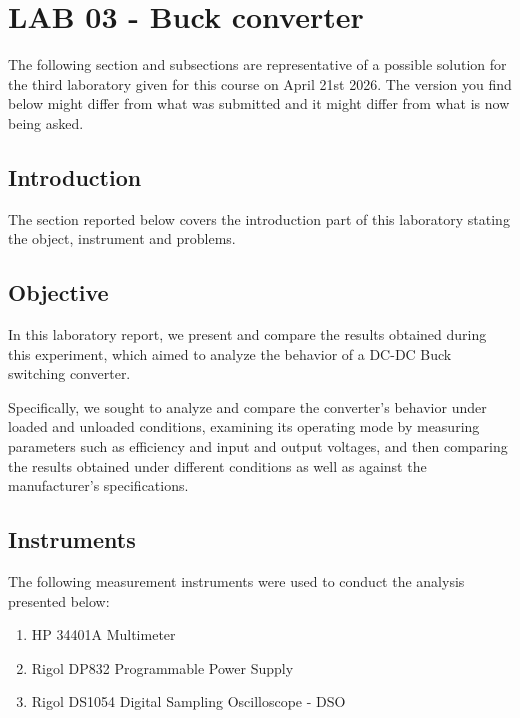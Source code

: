 \documentclass[../main.tex]{subfiles}
\begin{document}
\clearpage
\thispagestyle{empty}
\vspace*{7cm}
\section{LAB 03 - Buck converter}
\vspace*{1.5cm}

The following section and subsections are representative of a possible solution for the third laboratory given for this course on April 21st 2026.
The version you find below might differ from what was submitted and it might differ from what is now being asked.



\vspace{1cm}
\subsection{Introduction}

The section reported below covers the introduction part of this laboratory stating the object, instrument and problems.

\subsection*{Objective}

In this laboratory report, we present and compare the results obtained during this experiment, which aimed to analyze the behavior of a DC-DC Buck switching converter.

Specifically, we sought to analyze and compare the converter’s behavior under loaded and unloaded conditions, examining its operating mode by measuring parameters such as efficiency and input and output voltages, and then comparing the results obtained under different conditions as well as against the manufacturer’s specifications.

\subsection*{Instruments} \label{ins}

The following measurement instruments were used to conduct the analysis presented below:

\begin{enumerate}
	\item[\textbf{-}] HP 34401A Multimeter
	\item[\textbf{-}] Rigol DP832 Programmable Power Supply
	\item[\textbf{-}] Rigol DS1054 Digital Sampling Oscilloscope - DSO
\end{enumerate}
\end{document}
